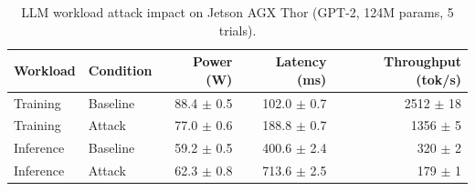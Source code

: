 \begin{table}[t]
  \centering
  \caption{LLM workload attack impact on Jetson AGX Thor (GPT-2, 124M params, 5 trials).}
  \label{tab:llm_workload}
  \small
  \begin{tabular}{llrrr}
    \toprule
    Workload & Condition & Power (W) & Latency (ms) & Throughput (tok/s) \\
    \midrule
    Training & Baseline & 88.4 $\pm$ 0.5 & 102.0 $\pm$ 0.7 & 2512 $\pm$ 18 \\
    Training & Attack & 77.0 $\pm$ 0.6 & 188.8 $\pm$ 0.7 & 1356 $\pm$ 5 \\
    \midrule
    Inference & Baseline & 59.2 $\pm$ 0.5 & 400.6 $\pm$ 2.4 & 320 $\pm$ 2 \\
    Inference & Attack & 62.3 $\pm$ 0.8 & 713.6 $\pm$ 2.5 & 179 $\pm$ 1 \\
    \bottomrule
  \end{tabular}
\end{table}